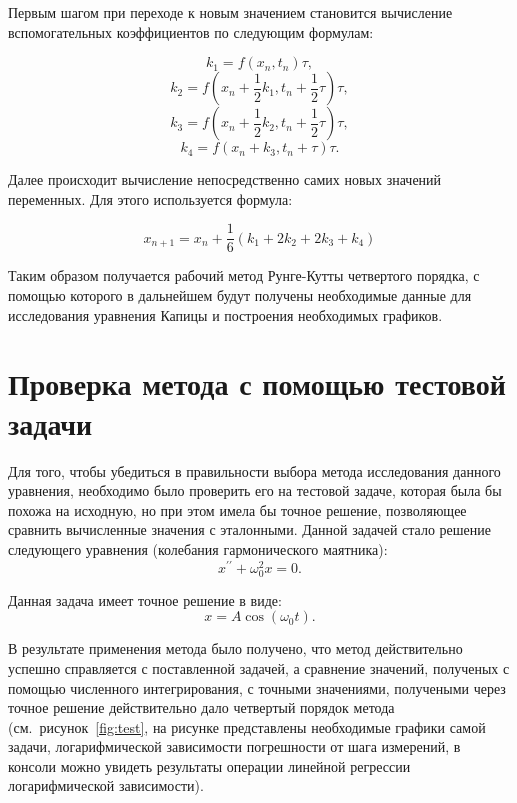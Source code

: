 \documentclass[a4paper,12pt]{article}
\begin{document}
	Первым шагом при переходе к новым значением становится вычисление 
	вспомогательных коэффициентов по следующим формулам:

	\newpage

	\begin{equation}
		k_1 = f(x_n, t_n)\tau,
	\end{equation}
	\begin{equation}
		k_2 = f(x_n + \frac12 k_1, t_n + \frac12 \tau)\tau,
	\end{equation}
	\begin{equation}
		k_3 = f(x_n + \frac12 k_2, t_n + \frac12 \tau)\tau,
	\end{equation}
	\begin{equation}
		k_4 = f(x_n + k_3, t_n + \tau)\tau.
	\end{equation}

	Далее происходит вычисление непосредственно самих новых значений 
	переменных. Для этого используется формула:

	\begin{equation}
		x_{n+1} = x_n + \frac16(k_1 + 2k_2 + 2k_3 + k_4)
	\end{equation}

	Таким образом получается рабочий метод Рунге-Кутты четвертого порядка, с
	помощью которого в дальнейшем будут получены необходимые данные для 
	исследования уравнения Капицы и построения необходимых графиков.

	\section{Проверка метода с помощью тестовой задачи}

	Для того, чтобы убедиться в правильности выбора метода исследования
	данного уравнения, необходимо было проверить его на тестовой задаче, 
	которая была бы похожа на исходную, но при этом имела бы точное решение,
	позволяющее сравнить вычисленные значения с эталонными. Данной задачей 
	стало решение следующего уравнения (колебания гармонического маятника):
	\begin{equation}
		x^{\prime\prime} + \omega_0^2 x = 0.
	\end{equation}

	Данная задача имеет точное решение в виде:
	\begin{equation}
		x = A\cos(\omega_0t).
	\end{equation}
	
	В результате применения метода было получено, что метод действительно 
	успешно справляется с поставленной задачей, а сравнение значений, 
	полученых с помощью численного интегрирования, с точными значениями, 
	получеными через точное решение действительно дало четвертый порядок 
	метода (см.~рисунок~\ref{fig:test}, на рисунке представлены необходимые
	графики самой задачи, логарифмической зависимости погрешности от шага
	измерений, в консоли можно увидеть результаты операции линейной регрессии
	логарифмической зависимости).
\end{document}

